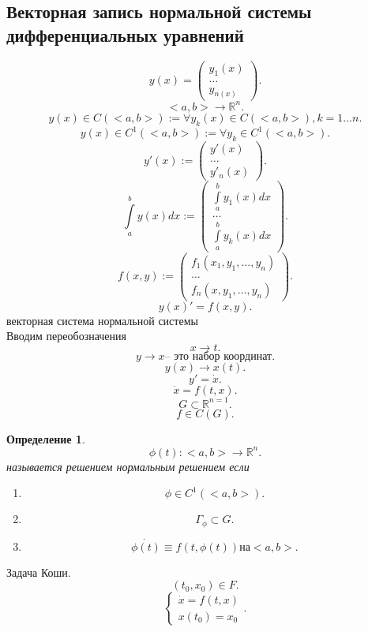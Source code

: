 \documentclass[14pt]{extarticle}
\newtheorem{definition}{Определение}
\begin{document}
\subsection{Векторная запись нормальной системы дифференциальных уравнений}
\[
	y(x)  = \begin{pmatrix}
		y_1(x) \\
		\dots  \\
		y_{n(x)}
	\end{pmatrix}
	.\]
\[
	<a,b> \to \mathbb{R}^{n}
	.\]
\[
	y(x) \in C(<a,b>) := \forall  y_{k}(x) \in C(<a,b>), k=1\dots n
	.\]
\[
	y(x) \in C^{1}(<a,b>) := \forall  y_{k} \in C^{1}(<a,b>)
	.\]
\[
	y'(x) := \begin{pmatrix}
		y'(x) \\
		\dots \\
		y'_{n}(x)
	\end{pmatrix}
	.\]
\[
	\int\limits_{a}^{b} y (x)  dx := \begin{pmatrix}
		\int\limits_{a}^{b} y_1(x)   dx \\
		\dots                           \\
		\int\limits_{a}^{b} y_{k} (x) dx
	\end{pmatrix}
	.\]
\[
	f(x,y) := \begin{pmatrix}
		f_1(x_1,y_1,\dots,y_{n}) \\
		\dots                    \\
		f_{n}(x,y_1,\dots,y_{n})
	\end{pmatrix}
	.\]
\[
	y(x)' = f(x,y)
	.\]
векторная система нормальной системы\\
Вводим переобозначения
\[
	x \to t
	.\]
\[
	y \to x \text{-- это набор координат}
	.\]
\[
	y(x) \to x(t)
	.\]
\[
	y' = \dot{x}
	.\]
\[
	\dot{x} = f(t,x)
	.\]
\[
	G \subset \mathbb{R}^{n =1}
	.\]
\[
	f \in C(G)
	.\]
\begin{definition}
	\[
		\phi(t) : <a,b> \to \mathbb{R}^{n}
		.\]
	называется решением нормальным решением если
	\begin{enumerate}
		\item \[
			      \phi \in C^{1}(<a,b>)
			      .\]
		\item
		      \[
			      \Gamma_{\phi} \subset G
			      .\]
		\item \[
			      \dot{\phi(t)} \equiv f(t,\phi(t)) \text{на} <a,b>
			      .\]
	\end{enumerate}
\end{definition}
Задача Коши.
\[
	(t_0,x_{0}) \in F
	.\]
\[
	\begin{cases}
		\dot{x} = f(t,x) \\
		x(t_0) = x_0
	\end{cases}
	.\]
\end{document}
